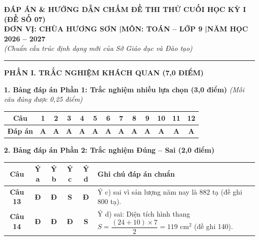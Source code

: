 \documentclass[11pt,a4paper]{article}
\begin{document}
\begin{center}
{\large\bfseries ĐÁP ÁN \& HƯỚNG DẪN CHẤM ĐỀ THI THỬ CUỐI HỌC KỲ I (ĐỀ SỐ 07)}\\[1.5mm]
{\bfseries ĐƠN VỊ: CHÙA HƯƠNG SƠN \quad|\quad MÔN: TOÁN -- LỚP 9 \quad|\quad NĂM HỌC 2026 -- 2027}\\[1mm]
\textit{(Chuẩn cấu trúc định dạng mới của Sở Giáo dục và Đào tạo)}
\end{center}

\vspace{1mm}
\hrule
\vspace{3mm}

\noindent
\textbf{\large PHẦN I. TRẮC NGHIỆM KHÁCH QUAN (7,0 ĐIỂM)}

\vspace{2mm}
\noindent
\textbf{1. Bảng đáp án Phần 1: Trắc nghiệm nhiều lựa chọn (3,0 điểm)} \textit{(Mỗi câu đúng được 0,25 điểm)}
\begin{center}
\begin{tabular}{|c|c|c|c|c|c|c|c|c|c|c|c|c|}
\hline
\textbf{Câu} & \textbf{1} & \textbf{2} & \textbf{3} & \textbf{4} & \textbf{5} & \textbf{6} & \textbf{7} & \textbf{8} & \textbf{9} & \textbf{10} & \textbf{11} & \textbf{12} \\
\hline
\textbf{Đáp án} & \textbf{A} & \textbf{A} & \textbf{A} & \textbf{A} & \textbf{A} & \textbf{A} & \textbf{A} & \textbf{A} & \textbf{A} & \textbf{A} & \textbf{A} & \textbf{A} \\
\hline
\end{tabular}
\end{center}

\vspace{2mm}
\noindent
\textbf{2. Bảng đáp án Phần 2: Trắc nghiệm Đúng -- Sai (2,0 điểm)}
\begin{center}
\begin{tabular}{|c|c|c|c|c|l|}
\hline
\textbf{Câu} & \textbf{Ý a} & \textbf{Ý b} & \textbf{Ý c} & \textbf{Ý d} & \textbf{Ghi chú đáp án chuẩn} \\
\hline
\textbf{Câu 13} & \textbf{Đ} & \textbf{Đ} & \textbf{S} & \textbf{Đ} & Ý c) sai vì sản lượng năm nay là 882 tạ (đề ghi 800 tạ). \\
\hline
\textbf{Câu 14} & \textbf{Đ} & \textbf{Đ} & \textbf{Đ} & \textbf{S} & Ý d) sai: Diện tích hình thang $S = \dfrac{(24+10) \times 7}{2} = 119\text{ cm}^2$ (đề ghi 140). \\
\hline
\end{tabular}
\end{center}
\end{document}
